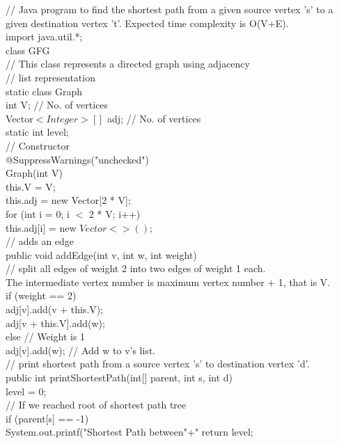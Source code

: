 \documentclass{article}
\begin{document}
\begin{enumerate}
// Java program to find the shortest path from a given source vertex 's' to a given destination vertex 't'. Expected time complexity is O(V+E).\\
import java.util.*;\\
class GFG\\
{
	// This class represents a directed graph using adjacency\\
	// list representation\\
	static class Graph\\
	{
		int V; // No. of vertices\\
		Vector$<Integer>[]$ adj; // No. of vertices\\
		static int level;\\
		// Constructor\\
		@SuppressWarnings("unchecked")\\
		Graph(int V)\\
		{
			this.V = V;\\
			this.adj = new Vector[2 * V];\\
			for (int i = 0; i $<$ 2 * V; i++)\\
				this.adj[i] = new $Vector<>()$;\\
		}
		// adds an edge\\
		public void addEdge(int v, int w, int weight)\\
		{
			// split all edges of weight 2 into two edges of weight 1 each. \\
			The intermediate vertex number is maximum vertex number + 1, that is V.\\
			if (weight == 2)\\
			{
				adj[v].add(v + this.V);\\
				adj[v + this.V].add(w);\\
			} else // Weight is 1\\
				adj[v].add(w); // Add w to v's list.\\
		}
		// print shortest path from a source vertex 's' to destination vertex 'd'.\\
		public int printShortestPath(int[] parent, int s, int d)\\
		{
			level = 0;\\
			// If we reached root of shortest path tree\\
			if (parent[s] == -1)\\
			{
				System.out.printf("Shortest Path between"+"%
				return level;\\
}}}}
\end{enumerate}
\end{document}
